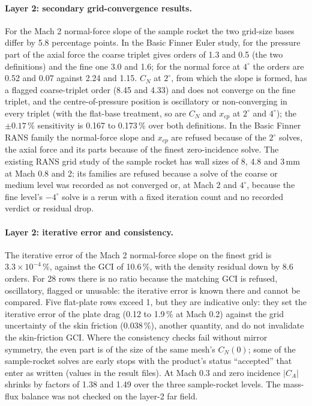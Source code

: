 \documentclass[twocolumn]{labreport}
\begin{document}
\paragraph{Layer 2: secondary grid-convergence results.}
For the Mach 2 normal-force slope of the sample rocket the two grid-size bases differ by 5.8 percentage points.
In the Basic Finner Euler study, for the pressure part of the axial force the coarse triplet gives orders of 1.3 and 0.5 (the two definitions) and the fine one 3.0 and 1.6; for the normal force at $4^\circ$ the orders are 0.52 and 0.07 against 2.24 and 1.15.
$C_N$ at $2^\circ$, from which the slope is formed, has a flagged coarse-triplet order (8.45 and 4.33) and does not converge on the fine triplet, and the centre-of-pressure position is oscillatory or non-converging in every triplet (with the flat-base treatment, so are $C_N$ and $x_{cp}$ at $2^\circ$ and $4^\circ$); the $\pm0.17\,\%$ sensitivity is 0.167 to 0.173\,\% over both definitions.
In the Basic Finner RANS family the normal-force slope and $x_{cp}$ are refused because of the $2^\circ$ solves, the axial force and its parts because of the finest zero-incidence solve.
The existing RANS grid study of the sample rocket has wall sizes of 8, 4.8 and 3\,mm at Mach 0.8 and 2; its families are refused because a solve of the coarse or medium level was recorded as not converged or, at Mach 2 and $4^\circ$, because the fine level's $-4^\circ$ solve is a rerun with a fixed iteration count and no recorded verdict or residual drop.

\paragraph{Layer 2: iterative error and consistency.}
The iterative error of the Mach 2 normal-force slope on the finest grid is $3.3\times10^{-4}\,\%$, against the GCI of 10.6\,\%, with the density residual down by 8.6 orders.
For 28 rows there is no ratio because the matching GCI is refused, oscillatory, flagged or unusable: the iterative error is known there and cannot be compared.
Five flat-plate rows exceed 1, but they are indicative only: they set the iterative error of the plate drag (0.12 to 1.9\,\% at Mach 0.2) against the grid uncertainty of the skin friction (0.038\,\%), another quantity, and do not invalidate the skin-friction GCI.
Where the consistency checks fail without mirror symmetry, the even part is of the size of the same mesh's $C_N(0)$; some of the sample-rocket solves are early stops with the product's status ``accepted'' that enter as written (values in the result files).
At Mach 0.3 and zero incidence $|C_A|$ shrinks by factors of 1.38 and 1.49 over the three sample-rocket levels.
The mass-flux balance was not checked on the layer-2 far field.
\end{document}
